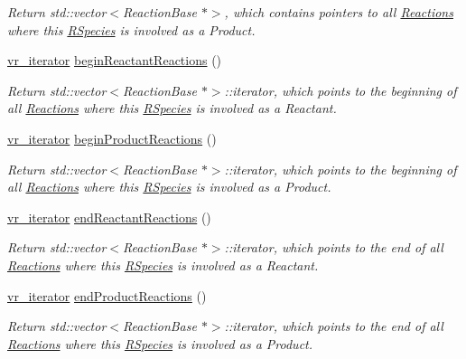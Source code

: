 \begin{DoxyCompactItemize}
\begin{DoxyCompactList}\small\item\em Return std\-::vector$<$\-Reaction\-Base $\ast$$>$, which contains pointers to all \hyperlink{classchem_1_1Reaction}{Reactions} where this \hyperlink{classchem_1_1RSpecies}{R\-Species} is involved as a Product. \end{DoxyCompactList}\item 
\hyperlink{namespacechem_a0decff3bb0047ac3a45bc12163f063e4}{vr\-\_\-iterator} \hyperlink{classchem_1_1RSpecies_abb162e65b6a0bb4953be60299e23a8e1}{begin\-Reactant\-Reactions} ()
\begin{DoxyCompactList}\small\item\em Return std\-::vector$<$\-Reaction\-Base $\ast$$>$\-::iterator, which points to the beginning of all \hyperlink{classchem_1_1Reaction}{Reactions} where this \hyperlink{classchem_1_1RSpecies}{R\-Species} is involved as a Reactant. \end{DoxyCompactList}\item 
\hyperlink{namespacechem_a0decff3bb0047ac3a45bc12163f063e4}{vr\-\_\-iterator} \hyperlink{classchem_1_1RSpecies_a28a722faa4f1784cf42cb1aeadee9bcb}{begin\-Product\-Reactions} ()
\begin{DoxyCompactList}\small\item\em Return std\-::vector$<$\-Reaction\-Base $\ast$$>$\-::iterator, which points to the beginning of all \hyperlink{classchem_1_1Reaction}{Reactions} where this \hyperlink{classchem_1_1RSpecies}{R\-Species} is involved as a Product. \end{DoxyCompactList}\item 
\hyperlink{namespacechem_a0decff3bb0047ac3a45bc12163f063e4}{vr\-\_\-iterator} \hyperlink{classchem_1_1RSpecies_a1b228d34e6277a15f672247480f4b51a}{end\-Reactant\-Reactions} ()
\begin{DoxyCompactList}\small\item\em Return std\-::vector$<$\-Reaction\-Base $\ast$$>$\-::iterator, which points to the end of all \hyperlink{classchem_1_1Reaction}{Reactions} where this \hyperlink{classchem_1_1RSpecies}{R\-Species} is involved as a Reactant. \end{DoxyCompactList}\item 
\hyperlink{namespacechem_a0decff3bb0047ac3a45bc12163f063e4}{vr\-\_\-iterator} \hyperlink{classchem_1_1RSpecies_a1b3db9e6c2246f6d1b4d98d344ff9e9e}{end\-Product\-Reactions} ()
\begin{DoxyCompactList}\small\item\em Return std\-::vector$<$\-Reaction\-Base $\ast$$>$\-::iterator, which points to the end of all \hyperlink{classchem_1_1Reaction}{Reactions} where this \hyperlink{classchem_1_1RSpecies}{R\-Species} is involved as a Product. \end{DoxyCompactList}\item 

\end{DoxyCompactItemize}
